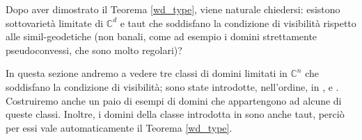 Dopo aver dimostrato il Teorema \ref{wd_type}, viene naturale chiedersi: esistono sottovarietà limitate di $\mathbb{C}^d$ e taut che soddisfano la condizione di visibilità rispetto alle simil-geodetiche (non banali, come ad esempio i domini strettamente pseudoconvessi, che sono molto regolari)?

In questa sezione andremo a vedere tre classi di domini limitati in $\mathbb{C}^n$ che soddisfano la condizione di visibilità; sono state introdotte, nell'ordine, in \cite{BZ1}, \cite{BM} e \cite{CMS}. Costruiremo anche un paio di esempi di domini che appartengono ad alcune di queste classi. Inoltre, i domini della classe introdotta in \cite{BM} sono anche taut, perciò per essi vale automaticamente il Teorema \ref{wd_type}.